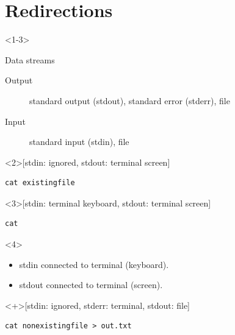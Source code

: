 \section{Redirections}

\begin{frame}[fragile]
  \begin{onlyenv}<1-3>
    \begin{block}{Data streams}
      \begin{description}
        \item[Output]
          standard output (stdout), standard error (stderr), file
        \item[Input] standard input (stdin), file
      \end{description}
    \end{block}
  \end{onlyenv}

  \begin{example}<2>[stdin: ignored, stdout: terminal screen]
    \begin{lstlisting}
cat existingfile
    \end{lstlisting}
  \end{example}

  \begin{example}<3>[stdin: terminal keyboard, stdout: terminal screen]
    \begin{lstlisting}
cat
    \end{lstlisting}
  \end{example}

  \begin{onlyenv}<4>
    \begin{remark}[By default]
      \begin{itemize}
        \item stdin connected to terminal (keyboard).
        \item stdout connected to terminal (screen).
      \end{itemize}
    \end{remark}
  \end{onlyenv}
\end{frame}

\begin{frame}[fragile]
  \begin{example}<+>[stdin: ignored, stderr: terminal, stdout: file]
    \begin{lstlisting}
cat nonexistingfile > out.txt
    \end{lstlisting}
  \end{example}
\end{frame}

